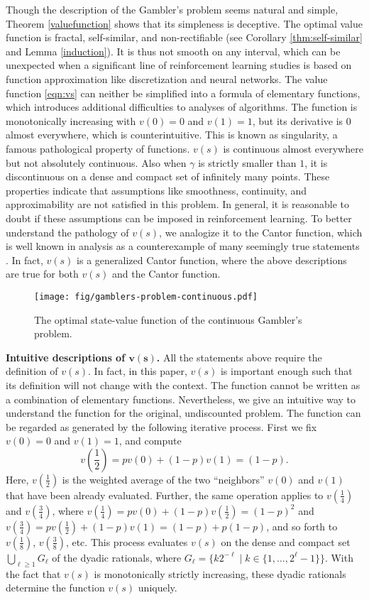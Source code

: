 \documentclass{article}
\theoremstyle{named}
\begin{document}
Though the description of the Gambler's problem seems natural and simple, Theorem \ref{valuefunction} shows that its simpleness is deceptive. 
The optimal value function is fractal, self-similar, and non-rectifiable (see Corollary \ref{thm:self-similar} and Lemma \ref{induction}). It is thus not smooth on any interval, which can be unexpected when a significant line of reinforcement learning studies is based on function approximation like discretization and neural networks. 
The value function \eqref{eqn:vs} can neither be simplified into a formula of elementary functions, which introduces additional difficulties to analyses of algorithms.
The function is monotonically increasing with $v(0)=0$ and $v(1)=1$, but its derivative is $0$ almost everywhere, which is counterintuitive. This is known as singularity, a famous pathological property of functions. 
$v(s)$ is continuous almost everywhere but not absolutely continuous. Also when $\gamma$ is strictly smaller than $1$, it is discontinuous on a dense and compact set of infinitely many points. These properties indicate that assumptions like smoothness, continuity, and approximability are not satisfied in this problem. In general, it is reasonable to doubt if these assumptions can be imposed in reinforcement learning. 
To better understand the pathology of $v(s)$, we analogize it to the Cantor function, which is well known in analysis as a counterexample of many seemingly true statements \citep{dovgoshey2006cantor}. In fact, $v(s)$ is a generalized Cantor function, where the above descriptions are true for both $v(s)$ and the Cantor function.  

\begin{figure}[t!]
\centering
\texttt{[image: fig/gamblers-problem-continuous.pdf]}
\caption{The optimal state-value function of the continuous Gambler's problem.}
\label{fig:valuefunction}
\end{figure}

\textbf{Intuitive descriptions of $\bm{v(s)}$.} All the statements above require the definition of $v(s)$. In fact, in this paper, $v(s)$ is important enough such that its definition will not change with the context. The function cannot be written as a combination of elementary functions. Nevertheless, we give an intuitive way to understand the function for the original, undiscounted problem. The function can be regarded as generated by the following iterative process. First we fix $v(0)=0$ and $v(1)=1$, and compute 
\[v(\frac{1}{2})= p v(0)+(1-p) v(1)=(1-p) .\]
Here, $v(\frac{1}{2})$ is the weighted average of the two ``neighbors'' $v(0)$ and $v(1)$ that have been already evaluated. Further, the same operation applies to $v(\frac{1}{4})$ and $v(\frac{3}{4})$, where $v(\frac{1}{4}) = p v(0)+(1-p) v(\frac{1}{2}) = (1-p)^2$ and $v(\frac{3}{4}) = p v(\frac{1}{2})+(1-p) v(1) = (1-p) + p(1-p)$, and so forth to $v(\frac{1}{8})$, $v(\frac{3}{8})$, etc. 
This process evaluates $v(s)$ on the dense and compact set $\bigcup_{\ell \ge 1} G_{\ell}$ of the dyadic rationals, where $G_\ell=\{k2^{-\ell}\mid k\in \{1,\dots,2^\ell-1\}\}$. With the fact that $v(s)$ is monotonically strictly increasing, these dyadic rationals determine the function $v(s)$ uniquely.
\end{document}
